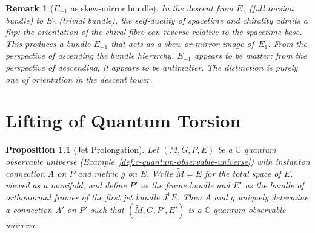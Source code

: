 \documentclass[12pt,a4paper]{report}
\newtheorem{proposition}[theorem]{Proposition}
\newtheorem{remark}[theorem]{Remark}
\begin{document}
\begin{remark}[$E_{-1}$ as skew-mirror bundle]
\label{rem:e-minus-one}
In the descent from $E_1$ (full torsion bundle) to $E_0$ (trivial
bundle), the self-duality of spacetime and chirality admits a flip: the
orientation of the chiral fibre can reverse relative to the spacetime
base.  This produces a bundle $E_{-1}$ that acts as a skew or mirror
image of~$E_1$.  From the perspective of ascending the bundle hierarchy,
$E_{-1}$ appears to be matter; from the perspective of descending, it
appears to be antimatter.  The distinction is purely one of orientation
in the descent tower.
\end{remark}
 \chapter{Lifting of Quantum Torsion}
\label{chap:torsion}



\begin{proposition}[Jet Prolongation]
\label{prop:jet-prolongation}
Let $(M, G, P, E)$ be a $\mathbb{C}$ quantum observable universe
(Example~\ref{def:c-quantum-observable-universe}) with instanton connection
$A$ on $P$ and metric $g$ on $E$.  Write $\widetilde{M} = E$ for the total
space of $E$, viewed as a manifold, and define $P'$ as the frame bundle and
$E'$ as the bundle of orthonormal frames of the first jet bundle $J^1 E$.
Then $A$ and $g$ uniquely determine a connection $A'$ on $P'$ such that
$(\widetilde{M}, G, P', E')$ is a $\mathbb{C}$ quantum observable universe.
\end{proposition}
\end{document}
